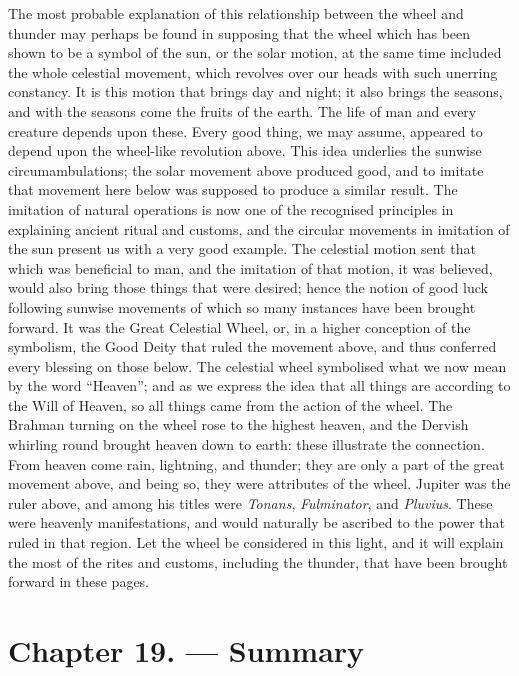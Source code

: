 \documentclass[a4paper, 11pt, oneside, polutonikogreek, english]{article}
\begin{document}
The most probable explanation of this relationship between the wheel and thunder may perhaps be found in supposing that the wheel which has been shown to be a symbol of the sun, or the solar motion, at the same time included the whole celestial movement, which revolves over our heads with such unerring constancy. It is this motion that brings day and night; it also brings the seasons, and with the seasons come the fruits of the earth. The life of man and every creature depends upon these. Every good thing, we may assume, appeared to depend upon the wheel-like revolution above. This idea underlies the sunwise circumambulations; the solar movement above produced good, and to imitate that movement here below was supposed to produce a similar result. The imitation of natural operations is now one of the recognised principles in explaining ancient ritual and customs, and the circular movements in imitation of the sun present us with a very good example. The celestial motion sent that which was beneficial to man, and the imitation of that motion, it was believed, would also bring those things that were desired; hence the notion of good luck following sunwise movements of which so many instances have been brought forward. It was the Great Celestial Wheel, or, in a higher conception of the symbolism, the Good Deity that ruled the movement above, and thus conferred every blessing on those below. The celestial wheel symbolised what we now mean by the word ``Heaven''; and as we express the idea that all things are according to the Will of Heaven, so all things came from the action of the wheel. The Brahman turning on the wheel rose to the highest heaven, and the Dervish whirling round brought heaven down to earth: these illustrate the connection. From heaven come rain, lightning, and thunder; they are only a part of the great movement above, and being so, they were attributes of the wheel. Jupiter was the ruler above, and among his titles were \emph{Tonans}, \emph{Fulminator}, and \emph{Pluvius}. These were heavenly manifestations, and would naturally be ascribed to the power that ruled in that region. Let the wheel be considered in this light, and it will explain the most of the rites and customs, including the thunder, that have been brought forward in these pages.
\clearpage
\section{Chapter 19. --- Summary}
\end{document}
